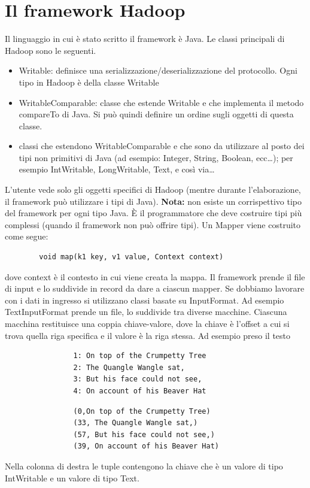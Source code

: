 \documentclass[italian,10pt,a4paper]{report}
\begin{document}
	\section{Il framework Hadoop}	
	Il linguaggio in cui è stato scritto il framework è Java. Le classi principali di Hadoop sono le seguenti.
	\begin{itemize}
		\item Writable: definisce una serializzazione/deserializzazione del protocollo. Ogni tipo in Hadoop è della classe Writable
		\item WritableComparable: classe che estende Writable e che implementa il metodo compareTo di Java. Si può quindi definire un ordine sugli oggetti di questa classe.
		\item classi che estendono WritableComparable e che sono da utilizzare al posto dei tipi non primitivi di Java (ad esempio: Integer, String, Boolean, ecc\dots); per esempio IntWritable, LongWritable, Text, e così via\dots
	\end{itemize}
	L'utente vede solo gli oggetti specifici di Hadoop (mentre durante l'elaborazione, il framework può utilizzare i tipi di Java). \textbf{Nota:} non esiste un corrispettivo tipo del framework per ogni tipo Java. È il programmatore che deve costruire tipi più complessi (quando il framework non può offrire tipi).
	Un Mapper viene costruito come segue:
	\begin{verbatim}
		void map(k1 key, v1 value, Context context)
	\end{verbatim}
	dove context è il contesto in cui viene creata la mappa. Il framework prende il file di input e lo suddivide in record da dare a ciascun mapper. Se dobbiamo lavorare con i dati in ingresso si utilizzano classi basate su InputFormat. Ad esempio TextInputFormat prende un file, lo suddivide tra diverse macchine. Ciascuna macchina restituisce una coppia chiave-valore, dove la chiave è l'offset a cui si trova quella riga specifica e il valore è la riga stessa. Ad esempio preso il testo 
	\begin{multicols}{2}

			\begin{verbatim}
				1: On top of the Crumpetty Tree
				2: The Quangle Wangle sat,
				3: But his face could not see,
				4: On account of his Beaver Hat
			\end{verbatim}
			\columnbreak
			\begin{verbatim}
				(0,On top of the Crumpetty Tree)
				(33, The Quangle Wangle sat,)
				(57, But his face could not see,)
				(39, On account of his Beaver Hat)
			\end{verbatim}			
	\end{multicols}
	Nella colonna di destra le tuple contengono la chiave che è un valore di tipo IntWritable e un valore di tipo Text.
	
\end{document}
